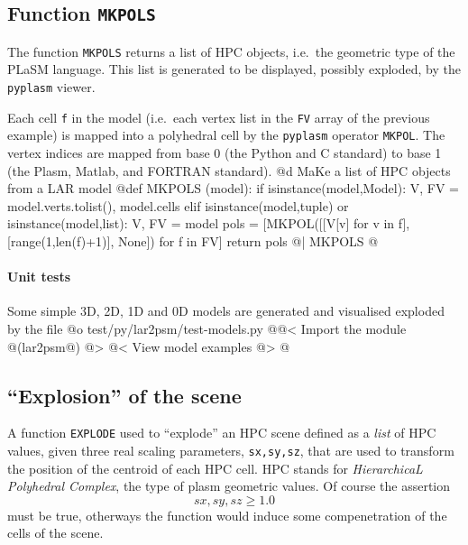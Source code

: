 \documentclass[11pt,oneside]{article}	%
\begin{document}
\subsection{Function \texttt{MKPOLS}}

The function \texttt{MKPOLS} returns a list of HPC objects, i.e.~the geometric type of the PLaSM language. This list is generated to be displayed, possibly exploded, by the \texttt{pyplasm} viewer. 

Each cell \texttt{f} in the model (i.e.~each vertex list in the \texttt{FV} array of the previous example) is mapped into a polyhedral cell by the \texttt{pyplasm} operator \texttt{MKPOL}. The vertex indices are mapped from base 0 (the Python and C standard) to base 1 (the Plasm, Matlab, and FORTRAN standard).
@d MaKe a list of HPC objects from a LAR model
@{def MKPOLS (model):
    if isinstance(model,Model):
        V, FV = model.verts.tolist(), model.cells
    elif isinstance(model,tuple) or isinstance(model,list):
        V, FV = model
    pols = [MKPOL([[V[v] for v in f],[range(1,len(f)+1)], None]) for f in FV]
    return pols  
@| MKPOLS @}

\paragraph{Unit tests}
Some simple 3D, 2D, 1D and 0D models are generated and visualised exploded by the file
@o test/py/lar2psm/test-models.py
@{@< Import the module @(lar2psm@) @>
@< View model examples @>
@}

\subsection{``Explosion'' of the scene}

A function \texttt{EXPLODE} used to ``explode'' an HPC scene defined as a \emph{list} of HPC values, given three real scaling parameters, \texttt{sx,sy,sz}, that are used to transform the position of the centroid of each HPC cell. HPC stands for \emph{HierarchicaL Polyhedral Complex}, the  type of plasm geometric values. Of course the assertion
\[
sx,sy,sz \geq 1.0
\]
must be true, otherways the function would induce some compenetration of the cells of the scene.
\end{document}
